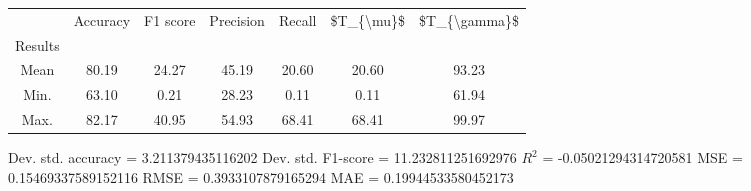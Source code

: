 \begin{tabular}{|c|c|c|c|c|c|c|}
\toprule
{} &  Accuracy &  F1 score &  Precision &  Recall &  \$T\_\{\textbackslash mu\}\$ &  \$T\_\{\textbackslash gamma\}\$ \\
Results &           &           &            &         &            &               \\
\hline
Mean    &     80.19 &     24.27 &      45.19 &   20.60 &      20.60 &         93.23 \\
Min.    &     63.10 &      0.21 &      28.23 &    0.11 &       0.11 &         61.94 \\
Max.    &     82.17 &     40.95 &      54.93 &   68.41 &      68.41 &         99.97 \\
\bottomrule
\end{tabular}

 Dev. std. accuracy = 3.211379435116202
 Dev. std. F1-score = 11.232811251692976
 $R^2$ = -0.05021294314720581
 MSE = 0.15469337589152116
 RMSE = 0.3933107879165294
 MAE = 0.19944533580452173